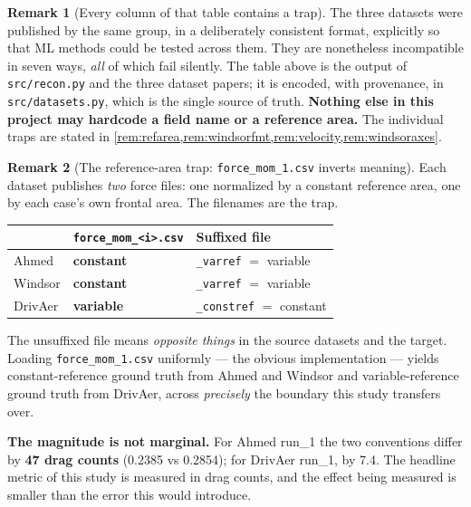 \documentclass[10pt,a4paper]{article}
\theoremstyle{definition}
\newtheorem{remark}{Remark}[section]
\begin{document}
\begin{remark}[Every column of that table contains a trap]
\label{rem:traps}
The three datasets were published by the same group, in a deliberately consistent
format, explicitly so that ML methods could be tested across them. They are
nonetheless incompatible in seven ways, \emph{all} of which fail silently. The table
above is the output of \texttt{src/recon.py} and the three dataset papers; it is
encoded, with provenance, in \texttt{src/datasets.py}, which is the single source of
truth. \textbf{Nothing else in this project may hardcode a field name or a reference
area.} The individual traps are stated in
\cref{rem:refarea,rem:windsorfmt,rem:velocity,rem:windsoraxes}.
\end{remark}

\begin{remark}[The reference-area trap: \texttt{force\_mom\_1.csv} inverts meaning]
\label{rem:refarea}
Each dataset publishes \emph{two} force files: one normalized by a constant reference
area, one by each case's own frontal area. The filenames are the trap.

\begin{center}\small
\begin{tabular}{@{}lll@{}}
\toprule
& \textbf{\texttt{force\_mom\_<i>.csv}} & \textbf{Suffixed file} \\
\midrule
Ahmed   & \textbf{constant} & \texttt{\_varref} $=$ variable \\
Windsor & \textbf{constant} & \texttt{\_varref} $=$ variable \\
DrivAer & \textbf{variable} & \texttt{\_constref} $=$ constant \\
\bottomrule
\end{tabular}
\end{center}

The unsuffixed file means \emph{opposite things} in the source datasets and the target.
Loading \texttt{force\_mom\_1.csv} uniformly --- the obvious implementation --- yields
constant-reference ground truth from Ahmed and Windsor and variable-reference ground
truth from DrivAer, across \emph{precisely} the boundary this study transfers over.

\textbf{The magnitude is not marginal.} For Ahmed run\_1 the two conventions differ by
\textbf{47 drag counts} (0.2385 vs 0.2854); for DrivAer run\_1, by 7.4. The headline
metric of this study is measured in drag counts, and the effect being measured is
smaller than the error this would introduce.


\end{remark}
\end{document}
